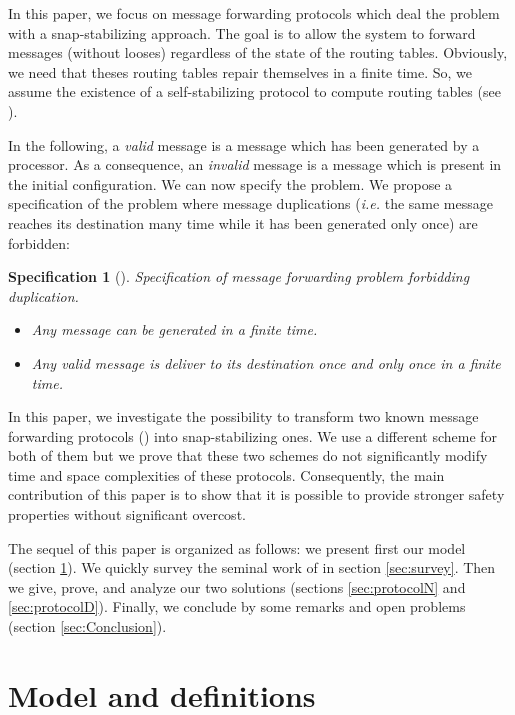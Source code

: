 \documentclass[11pt]{article}
\newtheorem{specification}{Specification}
\begin{document}
In this paper, we focus on message forwarding protocols which deal the problem with a snap-stabilizing approach. The goal is to allow the system to forward messages (without looses) regardless of the state of the routing tables. Obviously, we need that theses routing tables repair themselves in a finite time. So, we assume the existence of a self-stabilizing protocol to compute routing tables (see \cite{HC92,KK05,D97}).

In the following, a \emph{valid} message is a message which has been generated by a processor. As a consequence, an \emph{invalid} message is a message which is present in the initial configuration. We can now specify the problem. We propose a specification of the problem where message duplications (\emph{i.e.} the same message reaches its destination many time while it has been generated only once) are forbidden:

\begin{specification}[]\label{specif:spe2}
Specification of message forwarding problem forbidding duplication.
\begin{itemize}
	\item Any message can be generated in a finite time.
	\item Any valid message is deliver to its destination once and only once in a finite time.
\end{itemize}
\end{specification}

In this paper, we investigate the possibility to transform two known message forwarding protocols (\cite{MS78}) into snap-stabilizing ones. We use a different scheme for both of them but we prove that these two schemes do not significantly modify time and space complexities of these protocols. Consequently, the main contribution of this paper is to show that it is possible to provide stronger safety properties without significant overcost.

The sequel of this paper is organized as follows: we present first our model (section \ref{sec:Model}). We quickly survey the seminal work of \cite{MS78} in section \ref{sec:survey}. Then we give, prove, and analyze our two solutions (sections \ref{sec:protocolN} and \ref{sec:protocolD}). Finally, we conclude by some remarks and open problems (section \ref{sec:Conclusion}).

\section{Model and definitions}\label{sec:Model}
\end{document}

